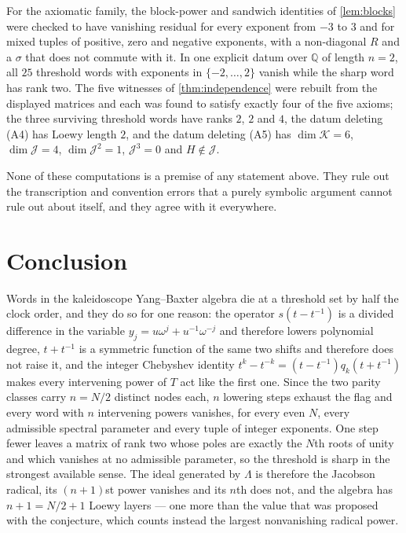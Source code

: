 \documentclass[11pt,reqno]{amsart}
\theoremstyle{plain}
\theoremstyle{definition}
\theoremstyle{remark}
\numberwithin{equation}{section}
\begin{document}
For the axiomatic family, the block-power and sandwich identities of
\cref{lem:blocks} were checked to have vanishing residual for every exponent
from $-3$ to $3$ and for mixed tuples of positive, zero and negative exponents,
with a non-diagonal $R$ and a $\sigma$ that does not commute with it. In one
explicit datum over $\mathbb{Q}$ of length $n=2$, all $25$ threshold words with
exponents in $\{-2,\dots,2\}$ vanish while the sharp word has rank two. The
five witnesses of \cref{thm:independence} were rebuilt from the displayed
matrices and each was found to satisfy exactly four of the five axioms; the
three surviving threshold words have ranks $2$, $2$ and $4$, the datum
deleting (A4) has Loewy length $2$, and the datum deleting (A5) has
$\dim\mathcal{K}=6$, $\dim\mathcal{J}=4$, $\dim\mathcal{J}^{2}=1$,
$\mathcal{J}^{3}=0$ and $H\notin\mathcal{J}$.

None of these computations is a premise of any statement above. They rule out
the transcription and convention errors that a purely symbolic argument cannot
rule out about itself, and they agree with it everywhere.

\section{Conclusion}
\label{sec:conclusion}

Words in the kaleidoscope Yang--Baxter algebra die at a threshold set by half
the clock order, and they do so for one reason: the operator
$s(t-t^{-1})$ is a divided difference in the variable
$y_{j}=u\omega^{j}+u^{-1}\omega^{-j}$ and therefore lowers polynomial degree,
$t+t^{-1}$ is a symmetric function of the same two shifts and therefore does
not raise it, and the integer Chebyshev identity
$t^{k}-t^{-k}=(t-t^{-1})q_{k}(t+t^{-1})$ makes every intervening power of $T$
act like the first one. Since the two parity classes carry $n=N/2$ distinct
nodes each, $n$ lowering steps exhaust the flag and every word with $n$
intervening powers vanishes, for every even $N$, every admissible spectral
parameter and every tuple of integer exponents. One step fewer leaves a matrix
of rank two whose poles are exactly the $N$th roots of unity and which
vanishes at no admissible parameter, so the threshold is sharp in the strongest
available sense. The ideal generated by $\Lambda$ is therefore the Jacobson
radical, its $(n+1)$st power vanishes and its $n$th does not, and the algebra
has $n+1=N/2+1$ Loewy layers --- one more than the value that was proposed
with the conjecture, which counts instead the largest nonvanishing radical
power.
\end{document}
